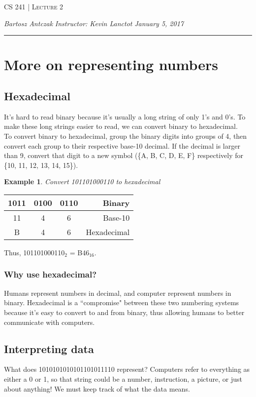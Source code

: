 \documentclass{report}
\newcommand{\lectureNum}{2}
\newcommand{\curDate}{January 5, 2017}
\newcommand{\course}{CS 241}
\newcommand{\instructor}{Kevin Lanctot}
\newtheorem{ex}{Example}[section]
\begin{document}
\begin{center}
\begin{Large}
\textsc{\course{} | Lecture \lectureNum{}}
\end{Large}
\end{center} 
\noindent \textit{Bartosz Antczak} \hfill
\textit{Instructor: \instructor{}} \hfill
\textit{\curDate{}}
\rule{\textwidth}{0.4pt}
\section{More on representing numbers}
\subsection{Hexadecimal}
It's hard to read binary because it's usually a long string of only 1's and 0's. To make these long strings easier to read, we can convert binary to hexadecimal.\\
To convert binary to hexadecimal, group the binary digits into groups of 4, then convert each group to their respective base-10 decimal. If the decimal is larger than 9, convert that digit to a new symbol (\{A, B, C, D, E, F\} respectively for \{10, 11, 12, 13, 14, 15\}).
\begin{ex}
Convert 101101000110 to hexadecimal
\end{ex}
\begin{center}
\begin{tabular}{ c | c | c | r }
1011 & 0100 & 0110 & Binary \\ \hline
11 & 4 & 6 & Base-10 \\ \hline
B & 4 & 6 & Hexadecimal \\
\end{tabular}
\end{center}
Thus, 101101000110$_2$ = B46$_{16}$.
\subsubsection{Why use hexadecimal?}
Humans represent numbers in decimal, and computer represent numbers in binary. Hexadecimal is a ``compromise" between these two numbering systems because it's easy to convert to and from binary, thus allowing humans to better communicate with computers.
\subsection{Interpreting data}
What does 1010101010101101011110 represent? Computers refer to everything as either a 0 or 1, so that string could be a number, instruction, a picture, or just about anything! We must keep track of what the data means.
\end{document}
